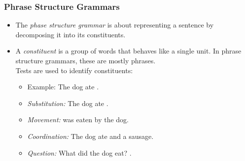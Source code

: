 			\subsubsection{Phrase Structure Grammars} %
				\begin{itemize}
					\item The \textit{phase structure grammar} is about representing a sentence by decomposing it into its constituents.
					\item A \textit{constituent} is a group of words that behaves like a single unit. In phrase structure grammars, these are mostly phrases. \\ Tests are used to identify constituents:
						\begin{itemize}
							\item Example: The dog ate .
							\item \textit{Substitution:} The dog ate .
							\item \textit{Movement:}  was eaten by the dog.
							\item \textit{Coordination:} The dog ate  and a sausage.
							\item \textit{Question:} What did the dog eat? .
						\end{itemize}
				\end{itemize}

